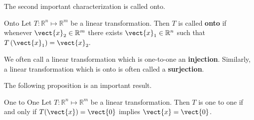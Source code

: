 The second important characterization is called onto.

\begin{definition}{Onto}\label{def:onto}
Let $T: \mathbb{R}^n \mapsto \mathbb{R}^m$ be a linear transformation. Then $T$ is called \textbf{onto}
 if whenever $\vect{x}_2 \in \mathbb{R}^{m}$ there exists 
$\vect{x}_1 \in \mathbb{R}^{n}$ such that $T\left( \vect{x}_1\right) = \vect{x}_2. $
\end{definition}

We often call a linear transformation which is one-to-one an \textbf{injection}. Similarly, a linear transformation which is onto is often called a \textbf{surjection}. 

The following proposition is an important result. 

\begin{proposition}{One to One}\label{prop:onetoonematrices}
Let $T:\mathbb{R}^n \mapsto \mathbb{R}^m$ be a linear transformation. Then $T$ is one to one if
and only if $T(\vect{x}) = \vect{0}$ implies $\vect{x}=\vect{0}$.
\end{proposition}

